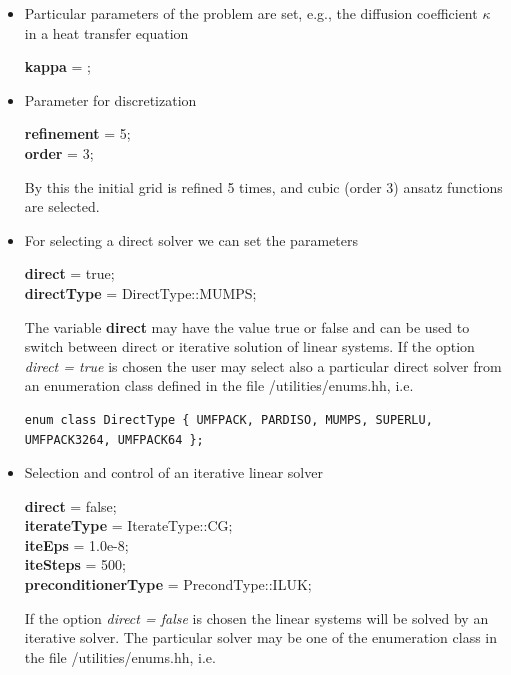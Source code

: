 \documentclass[11pt]{article}
\begin{document}
\begin{itemize}
\item Particular parameters of the problem are set,
e.g., the diffusion coefficient $\kappa$ in a heat transfer equation

{\bf kappa} = ;


\item Parameter for discretization

{\bf refinement} = 5;\\
{\bf order}      = 3;

By this the initial grid is refined 5 times,
and cubic (order 3) ansatz functions are selected.

\item For selecting a direct solver we can set the parameters

{\bf direct}     = true;\\
{\bf directType} = DirectType::MUMPS;

The variable {\bf direct} may have the value {\sc true} or {\sc false}
and can be used to switch between direct or iterative solution of linear
systems. If the option {\em direct = true} is chosen the user may select also 
a particular direct solver from an enumeration class defined in the file /utilities/enums.hh, i.e.

\begin{lstlisting}
enum class DirectType { UMFPACK, PARDISO, MUMPS, SUPERLU, UMFPACK3264, UMFPACK64 };
\end{lstlisting}



\item Selection and control of an iterative linear solver

{\bf direct}      = false;\\
{\bf iterateType} = IterateType::CG;\\
{\bf iteEps}      = 1.0e-8;\\
{\bf iteSteps}    = 500;\\
{\bf preconditionerType} = PrecondType::ILUK;

If the option {\em direct = false} is chosen the linear systems will be solved
by an iterative solver. The particular solver may be one of the enumeration class in
the file /utilities/enums.hh, i.e.


\end{itemize}
\end{document}
